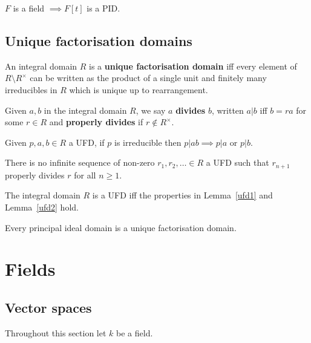 \documentclass[../Year2.tex]{subfiles}
\begin{document}
\begin{corollary}
    $F$ is a field $\implies F[t]$ is a PID.
\end{corollary}

\subsection{Unique factorisation domains}

\begin{definition}
    An integral domain $R$ is a \textbf{unique factorisation domain} iff every element of $R\setminus R^\times$ can be written as the product of a single unit and finitely many irreducibles in $R$ which is unique up to rearrangement.
\end{definition}

\begin{definition}[Division]
    Given $a,b$ in the integral domain $R$, we say $a$ \textbf{divides} $b$, written $a|b$ iff $b=ra$ for some $r\in R$ and \textbf{properly divides} if $r\not\in R^\times$.
\end{definition}

\begin{lemma}\label{ufd1}
    Given $p,a,b\in R$ a UFD, if $p$ is irreducible then $p|ab\implies p|a$ or $p|b$.
\end{lemma}

\begin{lemma}\label{ufd2}
    There is no infinite sequence of non-zero $r_1,r_2,\ldots\in R$ a UFD such that $r_{n+1}$ properly divides $r$ for all $n\geq1$.
\end{lemma}

\begin{theorem}
    The integral domain $R$ is a UFD iff the properties in Lemma~\ref{ufd1} and Lemma~\ref{ufd2} hold.
\end{theorem}

\begin{theorem}
    Every principal ideal domain is a unique factorisation domain.
\end{theorem}

\section{Fields}

\subsection{Vector spaces}
Throughout this section let $k$ be a field.
\end{document}
